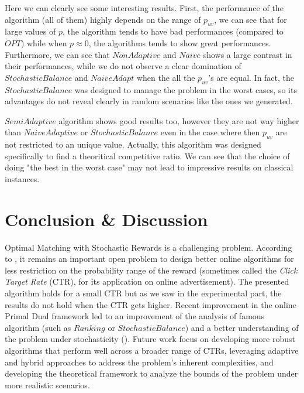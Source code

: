 \documentclass[12pt, twocolumn]{article}
\begin{document}
\par
\hspace{\parindent}Here we can clearly see some interesting results. First, the performance of the algorithm (all of them) highly depends on the range of $p_{uv}$, we can see that for large values of $p$, the algorithm tends to have bad performances (compared to $OPT$) while when $p \approx 0$, the algorithms tends to show great performances. Furthermore, we can see that $NonAdaptive$ and $Naive$ shows a large contrast in their performances, while we do not observe a clear domination of $StochasticBalance$ and $NaiveAdapt$ when the all the $p_{uv}$'s are  equal. In fact, the $StochasticBalance$ was designed to manage the problem in the worst cases, so its advantages do not reveal clearly in random scenarios like the ones we generated.
\par
\hspace{\parindent}$SemiAdaptive$ algorithm shows good results too, however they are not way higher than $NaiveAdaptive$ or $StochasticBalance$ even in the case where then $p_{uv}$ are not restricted to an unique value. Actually, this algorithm was designed specifically to find a theoritical competitive ratio. We can see that the choice of doing "the best in the worst case" may not lead to impressive results on classical instances.

\section{Conclusion \& Discussion}

\par
\hspace{\parindent}Optimal Matching with Stochastic Rewards is a challenging problem. According to \cite{survey2024}, it remains an important open problem to design better online algorithms for less restriction on the probability range of the reward (sometimes called the \textit{Click Target Rate} (CTR), for its application on online advertisement). The presented algorithm holds for a small CTR but as we saw in the experimental part, the results do not hold when the CTR gets higher. Recent improvement in the online Primal Dual framework led to an improvement of the analysis of famous algorithm (such as $Ranking$ or $StochasticBalance$) and a better understanding of the problem under stochasticity (\cite{huang2023}). Future work focus on developing more robust algorithms that perform well across a broader range of CTRs, leveraging adaptive and hybrid approaches to address the problem's inherent complexities, and developing the theoretical framework to analyze the bounds of the problem under more realistic scenarios.
\end{document}
